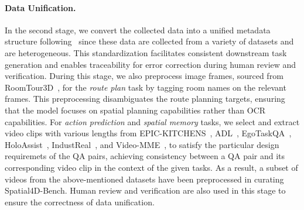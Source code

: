 \documentclass{article}
\begin{document}
\paragraph{Data Unification.}
In the second stage, we convert the collected data into a unified metadata structure following~\cite{Yang_2025_CVPR} since these data are collected from a variety of datasets and are heterogeneous.
This standardization facilitates consistent downstream task generation and enables traceability for error correction during human review and verification.
During this stage, we also preprocess image frames, sourced from RoomTour3D~\cite{han2025roomtour3d}, for the \textit{route plan} task by tagging room names on the relevant frames.
This preprocessing disambiguates the route planning targets, ensuring that the model focuses on spatial planning capabilities rather than OCR capabilities. For \textit{action prediction} and \textit{spatial memory} tasks, we select and extract video clips with various lengths from EPIC-KITCHENS~\cite{Damen2018EPICKITCHENS}, ADL~\cite{youhome2022}, EgoTaskQA~\cite{jia2022egotaskqa}, HoloAssist~\cite{wang2023holoassist}, IndustReal~\cite{schoonbeek2024industreal}, and Video-MME~\cite{fu2024video}, to satisfy the particular design requiremets of the QA pairs, achieving consistency between a QA pair and its corresponding video clip in the context of the given tasks. As a result, a subset of videos from the above-mentioned datasets have been preprocessed in curating Spatial4D-Bench.
Human review and verification are also used in this stage to ensure the correctness of data unification.
\end{document}
